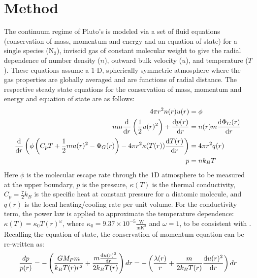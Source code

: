 \documentclass[times,12]{article}
\begin{document}
\section*{Method}
\noindent The continuum regime of Pluto's is modeled via a set of fluid equations (conservation of mass, momentum and energy and an equation of state) for a single species (N$_2$), inviscid gas of constant molecular weight to give the radial dependence of number density ($n$), outward bulk velocity ($u$), and temperature ($T$). These equations assume a 1-D, spherically symmetric atmosphere where the gas properties are globally averaged and are functions of radial distance. The respective steady state equations for the conservation of mass, momentum and energy and equation of state are as follows:
\begin{align}
4 \pi r^2 n(r) u(r) &= \phi \label{eq:consmass}\\
n m \dv{}{r} \left( \frac{1}{2} u(r)^2 \right) + \dv{p(r)}{r} &= n(r) m \dv{\Phi_G(r)}{r}\\
\dv{}{r} \left( \phi \left(C_p T + \frac{1}{2}m u(r)^2 -\Phi_G(r) \right) - 4 \pi r^2 \kappa(T(r)) \dv{T(r)}{r} \right) &= 4 \pi r^2 q(r) \label{eq:consenergy}\\
p &= n k_B T
\end{align}
\noindent Here $\phi$ is the molecular escape rate through the 1D atmosphere to be measured at the upper boundary, $p$ is the pressure, $\kappa(T)$ is the thermal conductivity, $C_p = \frac{7}{2} k_B$ is the specific heat at constant pressure for a diatomic molecule, and $q(r)$ is the local heating/cooling rate per unit volume. For the conductivity term, the power law is applied to approximate the temperature dependence: $\kappa(T) = \kappa_0 T(r)^{\omega}$, where $\kappa_0 = 9.37 \times 10^{-5} \frac{\mathrm{W}}{\mathrm{m K^2}}$ and $\omega = 1$, to be consistent with \cite{McNutt1989, Strobel2008, Tucker2012, Erwin2013}. Recalling the equation of state, the conservation of momentum equation can be re-written as:
\begin{align}
\frac{dp}{p(r)} = - \left(\frac{G M_P m}{k_B T(r) r^2} + \frac{m \dv{u(r)^2}{r} }{2 k_B T(r)}\right) dr = - \left( \frac{\lambda(r)}{r} + \frac{m}{2 k_B T(r)} \dv{u(r)^2}{r} \right) dr
\label{eq:num}
\end{align}
\end{document}
